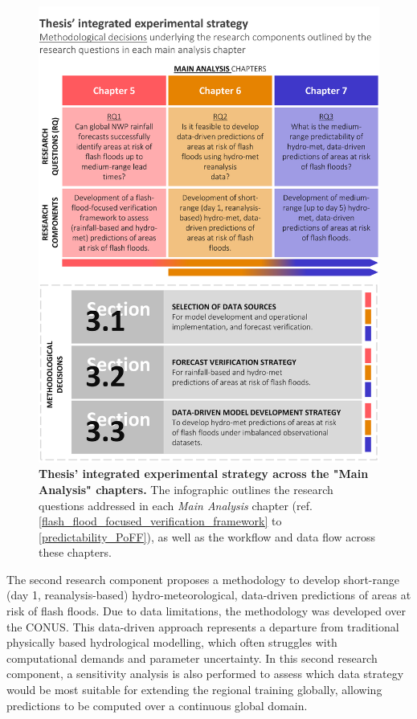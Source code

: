 \begin{figure}[htbp]
\centering
\includegraphics[width=\textwidth]{chapter_03/figures/integrated_experimental_strategy.png}
\caption{\textbf{Thesis' integrated experimental strategy across the "Main Analysis" chapters.} The infographic outlines the research questions addressed in each \textit{Main Analysis} chapter (ref. \ref{flash_flood_focused_verification_framework} to \ref{predictability_PoFF}), as well as the workflow and data flow across these chapters.}
\label{fig:integrated_experimental_strategy}
\end{figure}

The  second research component proposes a methodology to develop short-range (day 1, reanalysis-based) hydro-meteorological, data-driven predictions of areas at risk of flash floods. Due to data limitations, the methodology was developed over the CONUS. This data-driven approach represents a departure from traditional physically based hydrological modelling, which often struggles with computational demands and parameter uncertainty. In this second research component, a sensitivity analysis is also performed to assess which data strategy would be most suitable for extending the regional training globally, allowing predictions to be computed over a continuous global domain.

